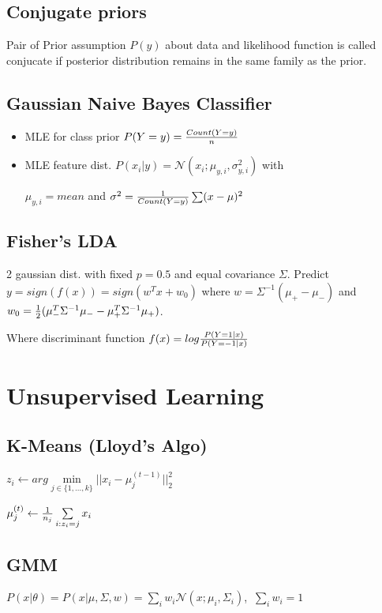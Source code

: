 \documentclass[11pt,twocolumn]{article}
\begin{document}
\subsection{Conjugate priors}
Pair of Prior assumption $P(y)$ about data and likelihood function is called conjucate if posterior distribution remains in the same family as the prior.	

\subsection{Gaussian Naive Bayes Classifier}
\begin{itemize}[noitemsep,nolistsep]
\item MLE for class prior $P(Y=y) = {{Count(Y=y)}\over n}$
\item MLE feature dist. $P(x_i|y) = \mathcal{N}(x_i;\mu_{y,i}, \sigma^2_{y,i})$ with

$\mu_{y,i} = mean$ and $\sigma^2 = {1 \over{Count(Y=y)}} \sum (x - \mu)^2$
\end{itemize}


\subsection{Fisher's LDA}
2 gaussian dist. with fixed $p=0.5$ and equal covariance $\Sigma$. Predict $y = sign(f(x)) = sign(w^Tx + w_0)$ where $w=\Sigma^{-1}(\mu_{+}-\mu_{-})$ and 
$w_0={1\over 2}(\mu^T_{-}\Sigma^{-1}\mu_{-} -\mu^T_{+} \Sigma^{-1}\mu_+)$.

Where discriminant function $f(x) = log {{P(Y=1|x)}\over{P(Y=-1|x)}}$

\section{Unsupervised Learning}
\subsection{K-Means (Lloyd's Algo)}

$z_i \leftarrow arg \min \limits_{j \in \lbrace 1,...,k \rbrace } || x_i - \mu_j^{(t-1)} ||_2^2 $

$ \mu_j^{(t)} \leftarrow {1 \over {n_j}} \sum \limits_{i:z_i = j} x_i$


\subsection{GMM}

$P(x|\theta) = P(x|\mu, \Sigma, w) = \sum \limits_i w_i \mathcal{N} (x;\mu_i, \Sigma_i)$, $~\sum \limits_i w_i = 1$
\end{document}
